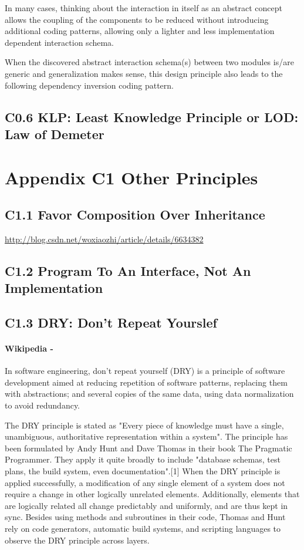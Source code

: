 \documentclass{book}
\begin{document}
In many cases, thinking about the interaction in itself as an abstract concept allows the coupling of the components to be reduced without introducing additional coding patterns,
allowing only a lighter and less implementation dependent interaction schema.

When the discovered abstract interaction schema(s) between two modules is/are generic and generalization makes sense,
this design principle also leads to the following dependency inversion coding pattern.
\subsection{C0.6 KLP: Least Knowledge Principle or LOD: Law of Demeter}

\section{Appendix C1 Other Principles}
\subsection{C1.1 Favor Composition Over Inheritance}
\url{http://blog.csdn.net/woxiaozhi/article/details/6634382}
\subsection{C1.2 Program To An Interface, Not An Implementation}
\subsection{C1.3 DRY: Don't Repeat Yourslef}\label{DRY}
\paragraph{Wikipedia -} In software engineering, don't repeat yourself (DRY) is a principle of software development aimed at reducing repetition of software patterns,
replacing them with abstractions; and several copies of the same data, using data normalization to avoid redundancy.

The DRY principle is stated as "Every piece of knowledge must have a single, unambiguous, authoritative representation within a system".
The principle has been formulated by Andy Hunt and Dave Thomas in their book The Pragmatic Programmer.
They apply it quite broadly to include "database schemas, test plans, the build system, even documentation".[1]
When the DRY principle is applied successfully, a modification of any single element of a system does not require a change in other logically unrelated elements.
Additionally, elements that are logically related all change predictably and uniformly, and are thus kept in sync.
Besides using methods and subroutines in their code, Thomas and Hunt rely on code generators, automatic build systems, and scripting languages to observe the DRY principle across layers.
\end{document}
